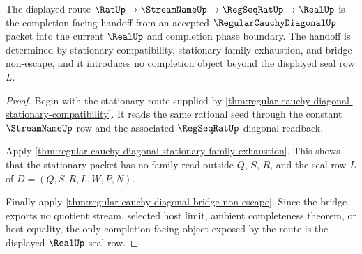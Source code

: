 \begin{theorem}
\label{thm:regular-cauchy-diagonal-real-completion-handoff}
The displayed route $\RatUp \to \StreamNameUp \to \RegSeqRatUp \to \RealUp$ is the completion-facing handoff from an accepted $\RegularCauchyDiagonalUp$ packet into the current $\RealUp$ and completion phase boundary. The handoff is determined by stationary compatibility, stationary-family exhaustion, and bridge non-escape, and it introduces no completion object beyond the displayed seal row $L$.
\end{theorem}
\begin{proof}
Begin with the stationary route supplied by \autoref{thm:regular-cauchy-diagonal-stationary-compatibility}. It reads the same rational seed through the constant $\StreamNameUp$ row and the associated $\RegSeqRatUp$ diagonal readback.

Apply \autoref{thm:regular-cauchy-diagonal-stationary-family-exhaustion}. This shows that the stationary packet has no family read outside $Q$, $S$, $R$, and the seal row $L$ of $D=(Q,S,R,L,W,P,N)$.

Finally apply \autoref{thm:regular-cauchy-diagonal-bridge-non-escape}. Since the bridge exports no quotient stream, selected host limit, ambient completeness theorem, or host equality, the only completion-facing object exposed by the route is the displayed $\RealUp$ seal row.
\end{proof}

